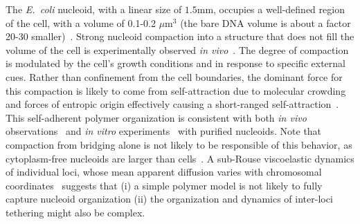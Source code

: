 \documentclass[a4paper,12pt,pre,superscriptaddress]{revtex4}
\begin{document}
The \emph{E.~coli} nucleoid, with a linear size of $1.5$mm, occupies a
well-defined region of the cell, with a volume of 0.1-0.2
$\mu$m$^3$ (the bare DNA volume is about a factor 20-30
smaller)~\cite{Stavans2006}.  Strong nucleoid compaction into a
structure that does not fill the volume of the cell is experimentally
observed \emph{in vivo}~\cite{Zim06b-a,HadizadehYazdi2012}. %
The degree of compaction is modulated by the cell's growth conditions and
in response to specific external cues.  Rather than confinement from
the cell boundaries, the dominant force for this compaction is likely
to come from self-attraction due to molecular crowding and forces of
entropic origin effectively causing a short-ranged
self-attraction~\cite{Odi98,Vries2010}. This self-adherent polymer
organization is consistent with both \emph{in vivo}
observations~\cite{HadizadehYazdi2012,Fisher2013} and \emph{in vitro}
experiments~\cite{Pelletier2012} with purified nucleoids.
%
Note that compaction from bridging alone is not likely to be
responsible of this behavior, as cytoplasm-free nucleoids are larger
than cells~\cite{Pelletier2012,Wegner2012,Thacker2013}.
%
A sub-Rouse viscoelastic dynamics of individual loci, whose mean
apparent diffusion varies with chromosomal
coordinates~\cite{Javer2013,Weber2010} suggests that (i) a simple
polymer model is not likely to fully capture nucleoid organization
(ii) the organization and dynamics of inter-loci tethering might also
be complex.
\end{document}
